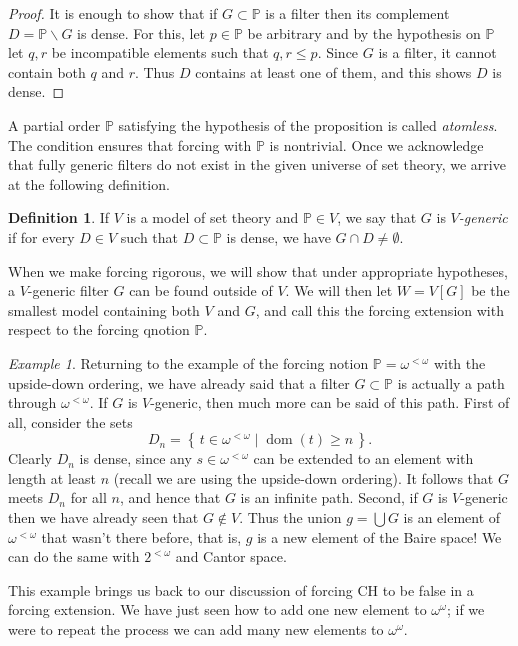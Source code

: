 \documentclass[11pt,oneside,a4paper]{amsbook}
\newcommand{\set}[1]{\left\{\,#1\,\right\}}
\newcommand{\PP}{\mathbb P}
\DeclareMathOperator{\dom}{dom}
\theoremstyle{definition}
\theoremstyle{plain}
\theoremstyle{definition}
\newtheorem{definition}[theorem]{Definition}
\theoremstyle{remark}
\newtheorem{example}[theorem]{Example}
\numberwithin{equation}{section}
\numberwithin{figure}{section}
\begin{document}
\begin{proof}
  It is enough to show that if $G\subset\PP$ is a filter then its complement $D=\PP\smallsetminus G$ is dense. For this, let $p\in\PP$ be arbitrary and by the hypothesis on $\PP$ let $q,r$ be incompatible elements such that $q,r\leq p$. Since $G$ is a filter, it cannot contain both $q$ and $r$. Thus $D$ contains at least one of them, and this shows $D$ is dense.
\end{proof}

A partial order $\PP$ satisfying the hypothesis of the proposition is called \emph{atomless}. The condition ensures that forcing with $\PP$ is nontrivial. Once we acknowledge that fully generic filters do not exist in the given universe of set theory, we arrive at the following definition.

\begin{definition}
  If $V$ is a model of set theory and $\PP\in V$, we say that $G$ is \emph{$V$-generic} if for every $D\in V$ such that $D\subset\PP$ is dense, we have $G\cap D\neq\emptyset$.
\end{definition}

When we make forcing rigorous, we will show that under appropriate hypotheses, a $V$-generic filter $G$ can be found outside of $V$. We will then let $W=V[G]$ be the smallest model containing both $V$ and $G$, and call this the forcing extension with respect to the forcing qnotion $\PP$.

\begin{example}
  Returning to the example of the forcing notion $\PP=\omega^{<\omega}$ with the upside-down ordering, we have already said that a filter $G\subset\PP$ is actually a path through $\omega^{<\omega}$. If $G$ is $V$-generic, then much more can be said of this path. First of all, consider the sets
  \[D_n=\set{t\in\omega^{<\omega}\mid \dom(t)\geq n}\text{.}
  \]
  Clearly $D_n$ is dense, since any $s\in\omega^{<\omega}$ can be extended to an element with length at least $n$ (recall we are using the upside-down ordering). It follows that $G$ meets $D_n$ for all $n$, and hence that $G$ is an infinite path. Second, if $G$ is $V$-generic then we have already seen that $G\notin V$. Thus the union $g=\bigcup G$ is an element of $\omega^{<\omega}$ that wasn't there before, that is, $g$ is a new element of the Baire space! We can do the same with $2^{<\omega}$ and Cantor space.
\end{example}

This example brings us back to our discussion of forcing CH to be false in a forcing extension. We have just seen how to add one new element to $\omega^\omega$; if we were to repeat the process we can add many new elements to $\omega^\omega$.
\end{document}
